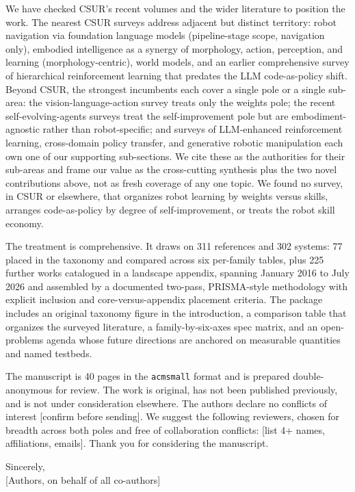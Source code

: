 \documentclass[11pt]{article}
\begin{document}
We have checked CSUR's recent volumes and the wider literature to position the work. The nearest
CSUR surveys address adjacent but distinct territory: robot navigation via foundation language
models (pipeline-stage scope, navigation only), embodied intelligence as a synergy of morphology,
action, perception, and learning (morphology-centric), world models, and an earlier comprehensive
survey of hierarchical reinforcement learning that predates the LLM code-as-policy shift. Beyond
CSUR, the strongest incumbents each cover a single pole or a single sub-area: the
vision-language-action survey treats only the weights pole; the recent self-evolving-agents
surveys treat the self-improvement pole but are embodiment-agnostic rather than robot-specific; and
surveys of LLM-enhanced reinforcement learning, cross-domain policy transfer, and generative
robotic manipulation each own one of our supporting sub-sections. We cite these as the authorities
for their sub-areas and frame our value as the cross-cutting synthesis plus the two novel
contributions above, not as fresh coverage of any one topic. We found no survey, in CSUR or
elsewhere, that organizes robot learning by weights versus skills, arranges code-as-policy by
degree of self-improvement, or treats the robot skill economy.

The treatment is comprehensive. It draws on 311 references and 302 systems: 77 placed in the
taxonomy and compared across six per-family tables, plus 225 further works catalogued in a
landscape appendix, spanning January 2016 to July 2026 and assembled by a documented two-pass,
PRISMA-style methodology with explicit inclusion and core-versus-appendix placement criteria. The
package includes an original taxonomy figure in the introduction, a comparison table that
organizes the surveyed literature, a family-by-six-axes spec matrix, and an open-problems agenda
whose future directions are anchored on measurable quantities and named testbeds.

The manuscript is 40 pages in the \texttt{acmsmall} format and is prepared double-anonymous for
review. The work is original, has not been published previously, and is not under consideration
elsewhere. The authors declare no conflicts of interest [confirm before sending]. We suggest the
following reviewers, chosen for breadth across both poles and free of collaboration conflicts:
[list 4+ names, affiliations, emails]. Thank you for considering the manuscript.

\enlargethispage{2\baselineskip}
\smallskip
\noindent Sincerely,\\[2pt]
[Authors, on behalf of all co-authors]
\end{document}
